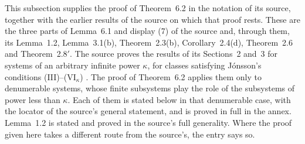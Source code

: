 This subsection supplies the proof of Theorem~6.2 in the notation of its
source, together with the earlier results of the source on which that proof
rests. These are the three parts of Lemma~6.1 and display (7) of the
source and, through them, its Lemma~1.2, Lemma~3.1(b), Theorem~2.3(b),
Corollary~2.4(d), Theorem~2.6 and Theorem~2.8\('\). The source proves the results of its Sections~2 and~3 for
systems of an arbitrary infinite power \(\kappa\), for classes satisfying
J\'onsson's conditions (III)--(VI\(_\kappa\))
\cite[pp.~40--41]{MorleyVaught1962}. The proof of Theorem~6.2 applies them
only to denumerable systems, whose finite subsystems play the role of the
subsystems of power less than \(\kappa\). Each of them is stated below in that
denumerable case, with the locator of the source's general statement, and is
proved in full in the annex. Lemma~1.2 is stated and proved in the source's
full generality. Where the proof given here takes a different route from the
source's, the entry says so.

